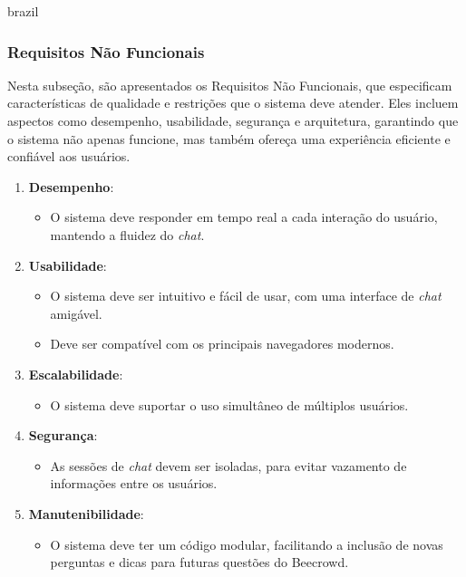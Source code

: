\begin{otherlanguage*}{brazil}
\subsubsection{Requisitos Não Funcionais}

Nesta subseção, são apresentados os Requisitos Não Funcionais, que especificam características de qualidade e restrições que o sistema deve atender. Eles incluem aspectos como desempenho, usabilidade, segurança e arquitetura, garantindo que o sistema não apenas funcione, mas também ofereça uma experiência eficiente e confiável aos usuários.

\begin{enumerate}[label=RNF\arabic* –]
    \item \textbf{Desempenho}:
    \begin{itemize}
        \item O sistema deve responder em tempo real a cada interação do usuário, mantendo a fluidez do \textit{chat}.
    \end{itemize}
    
    \item \textbf{Usabilidade}:
    \begin{itemize}
        \item O sistema deve ser intuitivo e fácil de usar, com uma interface de \textit{chat} amigável.
        \item Deve ser compatível com os principais navegadores modernos.
    \end{itemize}

    \item \textbf{Escalabilidade}:
    \begin{itemize}
        \item O sistema deve suportar o uso simultâneo de múltiplos usuários.
    \end{itemize}
    
    \item \textbf{Segurança}:
    \begin{itemize}
        \item As sessões de \textit{chat} devem ser isoladas, para evitar vazamento de informações entre os usuários.
    \end{itemize}
    
    \item \textbf{Manutenibilidade}:
    \begin{itemize}
        \item O sistema deve ter um código modular, facilitando a inclusão de novas perguntas e dicas para futuras questões do Beecrowd.
    \end{itemize}
    

\end{enumerate}
\end{otherlanguage*}
